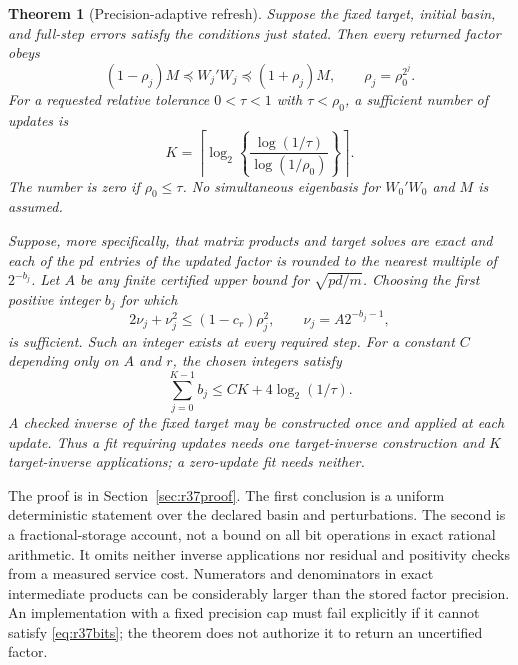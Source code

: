 \documentclass[ecta,nameyear,draft]{econsocart}
\newtheorem{theorem}{Theorem}
\theoremstyle{definition}
\theoremstyle{remark}
\begin{document}
\begin{theorem}[Precision-adaptive refresh]\label{thm:r37precision}
Suppose the fixed target, initial basin, and full-step errors satisfy the
conditions just stated. Then every returned factor obeys
\begin{equation}\label{eq:r37double}
 (1-\rho_j)M\preceq W_j'W_j\preceq(1+\rho_j)M,
 \qquad \rho_j=\rho_0^{2^j}.
\end{equation}
For a requested relative tolerance $0<\tau<1$ with $\tau<\rho_0$, a sufficient number of updates is
\begin{equation}\label{eq:r37cap}
 K=\left\lceil\log_2\left\{
       \frac{\log(1/\tau)}{\log(1/\rho_0)}\right\}\right\rceil.
\end{equation}
The number is zero if $\rho_0\leq\tau$. No simultaneous eigenbasis for
$W_0'W_0$ and $M$ is assumed.

Suppose, more specifically, that matrix products and target solves are exact
and each of the $pd$ entries of the updated factor is rounded to the nearest
multiple of $2^{-b_j}$. Let $A$ be any finite certified upper bound for
$\sqrt{pd/m}$. Choosing the first positive integer $b_j$ for which
\begin{equation}\label{eq:r37bits}
 2\nu_j+\nu_j^2\leq(1-c_r)\rho_j^2,
 \qquad \nu_j=A2^{-b_j-1},
\end{equation}
is sufficient. Such an integer exists at every required step. For a constant
$C$ depending only on $A$ and $r$, the chosen integers satisfy
\begin{equation}\label{eq:r37bitaccount}
 \sum_{j=0}^{K-1}b_j\leq CK+4\log_2(1/\tau).
\end{equation}
A checked inverse of the fixed target may be constructed once and applied
at each update. Thus a fit requiring updates needs one target-inverse
construction and $K$ target-inverse applications; a zero-update fit needs
neither.
\end{theorem}

The proof is in Section~\ref{sec:r37proof}. The first conclusion is a
uniform deterministic statement over the declared basin and perturbations.
The second is a fractional-storage account, not a bound on all bit operations
in exact rational arithmetic. It omits neither inverse applications nor
residual and positivity checks from a measured service cost. Numerators and
denominators in exact intermediate products can be considerably larger than
the stored factor precision. An implementation with a fixed precision cap
must fail explicitly if it cannot satisfy \eqref{eq:r37bits}; the theorem
does not authorize it to return an uncertified factor.
\end{document}

